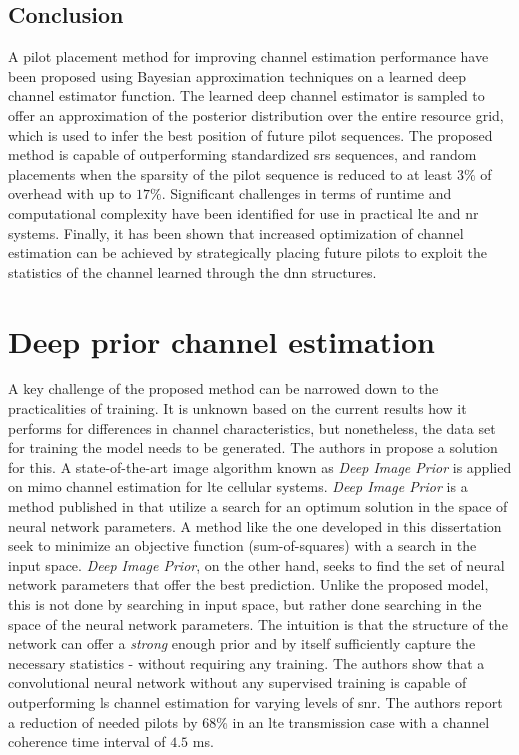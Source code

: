 \subsection{Conclusion}
A pilot placement method for improving channel estimation performance have been proposed using Bayesian approximation techniques on a learned deep channel estimator function. The learned deep channel estimator is sampled to offer an approximation of the posterior distribution over the entire resource grid, which is used to infer the best position of future pilot sequences. The proposed method is capable of outperforming standardized \gls{srs} sequences, and random placements when the sparsity of the pilot sequence is reduced to at least $3\%$ of overhead with up to $17\%$. Significant challenges in terms of runtime and computational complexity have been identified for use in practical \gls{lte} and \gls{nr} systems. Finally, it has been shown that increased optimization of channel estimation can be achieved by strategically placing future pilots to exploit the statistics of the channel learned through the \gls{dnn} structures.

\section{Deep prior channel estimation}\label{sec:research_trends_channel_estimation}
A key challenge of the proposed method can be narrowed down to the practicalities of training. It is unknown based on the current results how it performs for differences in channel characteristics, but nonetheless, the data set for training the model needs to be generated. The authors in \cite{Balevi2019} propose a solution for this. A state-of-the-art image algorithm known as \emph{Deep Image Prior} is applied on \gls{mimo} channel estimation for \gls{lte} cellular systems. \emph{Deep Image Prior} is a method published in \cite{DeepPrior} that utilize a search for an optimum solution in the space of neural network parameters. A method like the one developed in this dissertation seek to minimize an objective function (sum-of-squares) with a search in the input space. \emph{Deep Image Prior}, on the other hand, seeks to find the set of neural network parameters that offer the best prediction. Unlike the proposed model, this is not done by searching in input space, but rather done searching in the space of the neural network parameters. The intuition is that the structure of the network can offer a \emph{strong} enough prior and by itself sufficiently capture the necessary statistics  - without requiring any training. The authors show that a convolutional neural network without any supervised training is capable of outperforming \gls{ls} channel estimation for varying levels of \gls{snr}. The authors report a reduction of needed pilots by $68\%$ in an \gls{lte} transmission case with a channel coherence time interval of $4.5$ ms.

